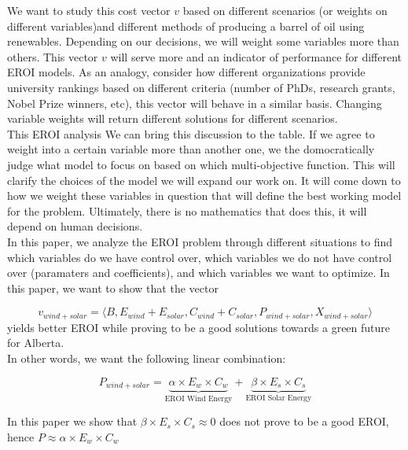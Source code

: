 \documentclass[12pt]{article}
\begin{document}
We want to study this cost vector $v$ based on different scenarios (or weights on different variables)and different methods of producing a barrel of oil using renewables. Depending on our decisions, we will weight some variables more than others. This vector $v$ will serve more and an indicator of performance for different EROI models. As an analogy, consider how different organizations provide university rankings based on different criteria (number of PhDs, research grants, Nobel Prize winners, etc), this vector will behave in a similar basis.  Changing variable weights will return different solutions for different scenarios. \\

This EROI analysis We can bring this discussion to the table. If we agree to weight into a certain variable more than another one, we the domocratically judge what model to focus on based on which multi-objective function. This will clarify the choices of the model we will expand our work on. It will come down to how we weight these variables in question that will define the best working model for the problem. Ultimately, there is no mathematics that does this, it will depend on human decisions. \\

In this paper, we analyze the EROI problem through different situations to find which variables do we have control over, which variables we do not have control over (paramaters and coefficients), and which variables we want to optimize. In this paper, we want to show that the vector 

\begin{displaymath}
v_{wind+solar}= \langle B, E_{wind} + E_{solar}, C_{wind} + C_{solar}, P_{wind + solar}, X_{wind+solar}\rangle
\end{displaymath}
 yields better EROI while proving to be a good solutions towards a green future for Alberta. \\

In other words, we want the following linear combination:

\begin{displaymath}
P_{wind+solar} = \underbrace{\alpha \times E_w \times C_w}_\text{EROI Wind Energy} + \underbrace{ \beta \times E_s \times C_s}_\text{EROI Solar Energy}
\end{displaymath}

In this paper we show that $\beta \times E_s \times C_s \approx 0$ does not prove to be a good EROI, hence $P \approx \alpha \times E_w \times C_w $\\
\end{document}

